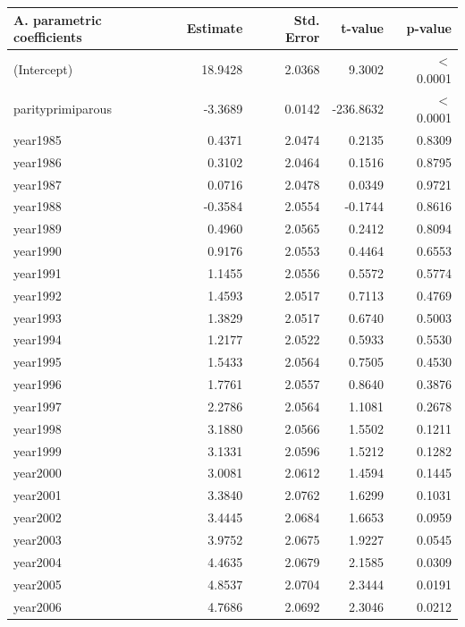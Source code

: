     \begin{table}[H]
    \centering
    \begin{tabular}{lrrrr}
    \textbf{A. parametric coefficients} & Estimate & Std. Error & t-value & p-value \\ 
       \hline
       \hline
      (Intercept) & 18.9428 & 2.0368 & 9.3002 & $<$ 0.0001 \\ 
      parityprimiparous & -3.3689 & 0.0142 & -236.8632 & $<$ 0.0001 \\ 
      year1985 & 0.4371 & 2.0474 & 0.2135 & 0.8309 \\ 
      year1986 & 0.3102 & 2.0464 & 0.1516 & 0.8795 \\ 
      year1987 & 0.0716 & 2.0478 & 0.0349 & 0.9721 \\ 
      year1988 & -0.3584 & 2.0554 & -0.1744 & 0.8616 \\ 
      year1989 & 0.4960 & 2.0565 & 0.2412 & 0.8094 \\ 
      year1990 & 0.9176 & 2.0553 & 0.4464 & 0.6553 \\ 
      year1991 & 1.1455 & 2.0556 & 0.5572 & 0.5774 \\ 
      year1992 & 1.4593 & 2.0517 & 0.7113 & 0.4769 \\ 
      year1993 & 1.3829 & 2.0517 & 0.6740 & 0.5003 \\ 
      year1994 & 1.2177 & 2.0522 & 0.5933 & 0.5530 \\ 
      year1995 & 1.5433 & 2.0564 & 0.7505 & 0.4530 \\ 
      year1996 & 1.7761 & 2.0557 & 0.8640 & 0.3876 \\ 
      year1997 & 2.2786 & 2.0564 & 1.1081 & 0.2678 \\ 
      year1998 & 3.1880 & 2.0566 & 1.5502 & 0.1211 \\ 
      year1999 & 3.1331 & 2.0596 & 1.5212 & 0.1282 \\ 
      year2000 & 3.0081 & 2.0612 & 1.4594 & 0.1445 \\ 
      year2001 & 3.3840 & 2.0762 & 1.6299 & 0.1031 \\ 
      year2002 & 3.4445 & 2.0684 & 1.6653 & 0.0959 \\ 
      year2003 & 3.9752 & 2.0675 & 1.9227 & 0.0545 \\ 
      year2004 & 4.4635 & 2.0679 & 2.1585 & 0.0309 \\ 
      year2005 & 4.8537 & 2.0704 & 2.3444 & 0.0191 \\ 
      year2006 & 4.7686 & 2.0692 & 2.3046 & 0.0212 \\ 

\end{tabular}
\end{table}
